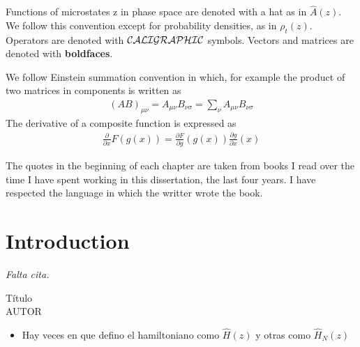 \documentclass[b5paper,openright,11pt]{book}
\newcommand{\Pendiente}[1]{{\color{green}#1}} %
\newcommand{\Tirar}[1]{{\color{Magenta}#1}}   %
\begin{document}
Functions of microstates z in phase space are denoted with a hat as in $\hat{A}(z)$. We follow this convention except for probability densities, as in $\rho_t(z)$. Operators are denoted with ${\cal CALIGRAPHIC}$ symbols. Vectors and matrices are denoted with {\bf boldfaces}.

\Tirar{
We follow Einstein summation convention in which, for example the product of two matrices in components is written as
\begin{align}
    (AB)_{\mu\nu} = A_{\mu\nu}B_{\nu\sigma}=\sum_{\nu}A_{\mu\nu}B_{\nu\sigma} \nonumber
\end{align}
The derivative of a composite function is expressed as
\begin{align}
    \frac{\partial}{\partial x}F(g(x))=\frac{\partial F}{\partial g}(g(x))\frac{\partial g}{\partial x}(x) \nonumber
\end{align}
}

The quotes in the beginning of each chapter are taken from books I read over the time I have spent working in this dissertation, the last four years. I have respected the language in which the writter wrote the book. 



\setcounter{chapter}{-1}
\chapter{Introduction}\label{Chap:Intro}
\pagestyle{chapters}  %
\epigraph{\textit{Falta cita.}}{Título \\ AUTOR}

\Pendiente{\begin{itemize}
    \item Hay veces en que defino el hamiltoniano como $\hat{H}(z)$ y otras como $\hat{H}_N(z)$ 
\end{itemize}}
\end{document}
